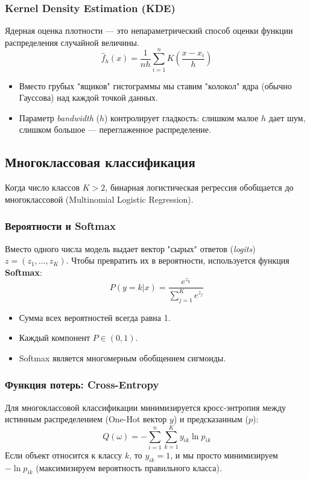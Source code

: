 \documentclass[12pt]{article}
\begin{document}
\subsubsection{Kernel Density Estimation (KDE)}
Ядерная оценка плотности — это непараметрический способ оценки функции распределения случайной величины.
\[ \hat{f}_h(x) = \frac{1}{nh} \sum_{i=1}^n K\left(\frac{x - x_i}{h}\right) \]
\begin{itemize}
    \item Вместо грубых "ящиков" гистограммы мы ставим "колокол" ядра (обычно Гауссова) над каждой точкой данных.
    \item Параметр \textit{bandwidth} ($h$) контролирует гладкость: слишком малое $h$ дает шум, слишком большое — переглаженное распределение.
\end{itemize}

\newpage
\subsection{Многоклассовая классификация}
Когда число классов $K > 2$, бинарная логистическая регрессия обобщается до многоклассовой (Multinomial Logistic Regression).

\subsubsection{Вероятности и Softmax}
Вместо одного числа модель выдает вектор "сырых" ответов (\textit{logits}) $z = (z_1, \dots, z_K)$. Чтобы превратить их в вероятности, используется функция \textbf{Softmax}:
\[ P(y=k|x) = \frac{e^{z_k}}{\sum_{j=1}^K e^{z_j}} \]
\begin{itemize}
    \item Сумма всех вероятностей всегда равна 1.
    \item Каждый компонент $P \in (0, 1)$.
    \item Softmax является многомерным обобщением сигмоиды.
\end{itemize}

\subsubsection{Функция потерь: Cross-Entropy}
Для многоклассовой классификации минимизируется кросс-энтропия между истинным распределением (One-Hot вектор $y$) и предсказанным ($p$):
\[ Q(\omega) = -\sum_{i=1}^n \sum_{k=1}^K y_{ik} \ln p_{ik} \]
Если объект относится к классу $k$, то $y_{ik}=1$, и мы просто минимизируем $-\ln p_{ik}$ (максимизируем вероятность правильного класса).
\end{document}
